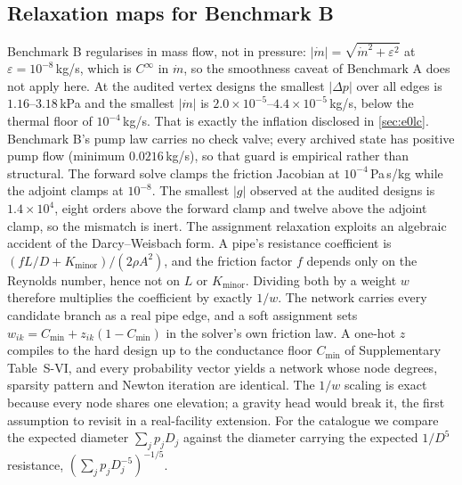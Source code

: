 \documentclass[journal]{IEEEtran}
\begin{document}
\subsection{Relaxation maps for Benchmark B}
Benchmark B regularises in mass flow, not in pressure: $|\dot m|=\sqrt{\dot
m^2+\varepsilon^2}$ at $\varepsilon=10^{-8}$\,kg/s, which is $C^\infty$ in $\dot
m$, so the smoothness caveat of Benchmark A does not apply here.  At the audited
vertex designs the smallest $|\Delta p|$ over all edges is $1.16$--$3.18$\,kPa and
the smallest $|\dot m|$ is $2.0\times10^{-5}$--$4.4\times10^{-5}$\,kg/s, below the
thermal floor of $10^{-4}$\,kg/s. That is exactly the inflation disclosed in
\cref{sec:e0lc}.  Benchmark B's pump law carries no check valve; every archived
state has positive pump flow (minimum $0.0216$\,kg/s), so that guard is empirical
rather than structural.  The forward solve clamps the friction Jacobian at
$10^{-4}$\,Pa\,s/kg while the adjoint clamps at $10^{-8}$. The smallest $|g|$
observed at the audited designs is $1.4\times10^{4}$, eight orders above the forward clamp and twelve above the adjoint clamp, so the mismatch is inert.
The assignment relaxation exploits an algebraic accident of the Darcy--Weisbach
form.  A pipe's resistance coefficient is $(fL/D+K_{\mathrm{minor}})/(2\rho A^2)$,
and the friction factor $f$ depends only on the Reynolds number, hence not on $L$
or $K_{\mathrm{minor}}$.  Dividing both
by a weight $w$ therefore multiplies the coefficient by exactly $1/w$.  The
network carries every candidate branch as a real pipe edge, and a soft assignment
sets $w_{ik}=C_{\min}+z_{ik}(1-C_{\min})$ in the solver's own friction law.  A
one-hot $z$ compiles to the hard design up to the conductance floor $C_{\min}$ of Supplementary Table~S-VI, and every
probability vector yields a network whose node
degrees, sparsity pattern and Newton iteration are identical.  The $1/w$ scaling
is exact because every node shares one elevation; a gravity head would break it,
the first assumption to revisit in a real-facility extension.  For the catalogue
we compare the expected diameter $\sum_j p_jD_j$ against the diameter carrying
the expected $1/D^5$ resistance, $(\sum_j p_jD_j^{-5})^{-1/5}$.
\end{document}
